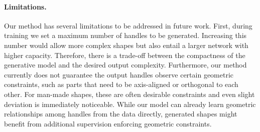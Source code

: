 \paragraph*{Limitations.}
Our method has several limitations to be addressed in future work. 
First, during training we set a maximum number of handles to be generated. 
Increasing this number would allow more complex shapes but also entail a larger network with higher capacity. 
Therefore, there is a trade-off between the compactness of the generative model and the desired output complexity. 
Furthermore, our method currently does not guarantee the output handles observe certain geometric constraints, such as parts that need to be axis-aligned or orthogonal to each other. 
For man-made shapes, these are often desirable constraints and even slight deviation is immediately noticeable. 
While our model can already learn geometric relationships among handles from the data directly, generated shapes might benefit from additional supervision enforcing geometric constraints. 

